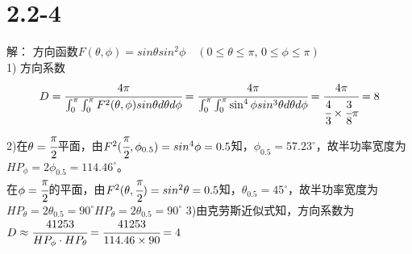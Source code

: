 \documentclass[a4paper,11pt]{article}
\begin{document}
\section{2.2-4}
解： 方向函数$F(\theta,\phi)=sin\theta sin^2\phi\quad(0\leq\theta\leq\pi,\,0\leq\phi\leq\pi)$\\
1) 方向系数
$$
D=\cfrac{4\pi}{\int_0^{\pi}\int_0^{\pi}F^2(\theta,\phi)sin\theta d\theta d\phi }=\cfrac{4\pi}{\int_0^{\pi}\int_0^{\pi}\sin^4\phi sin^3\theta d\theta d\phi }=\cfrac{4\pi}{\cfrac{4}{3}\times \cfrac{3}{8}\pi}=8
$$
2)在$\theta=\cfrac{\pi}{2}$平面，由$F^2(\cfrac{\pi}{2},\phi _{0.5})=sin^4\phi=0.5$知，$\phi _{0.5}=57.23^\circ$，故半功率宽度为$HP_{\phi}=2\phi_{0.5}=114.46^\circ$。\\
在$\phi=\cfrac{\pi}{2}$的平面，由$F^2(\theta,\cfrac{\pi}{2})=sin^2\theta=0.5$知，$\theta_{0.5}=45^\circ$，故半功率宽度为$HP_{\theta}=2\theta_{0.5}=90^\circ$$HP_{\theta}=2\theta_{0.5}=90^\circ$
3)由克劳斯近似式知，方向系数为$D\approx\cfrac{41253}{HP_{\phi}\cdot HP_{\theta}}=\cfrac{41253}{114.46\times 90}=4$\\
\\
\end{document}
